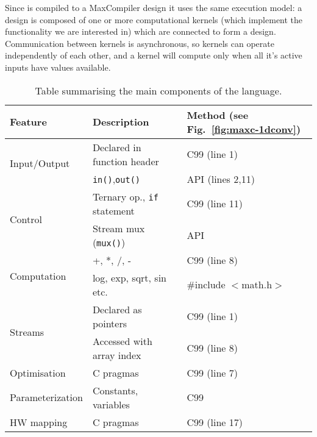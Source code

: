 Since \MAXC{} is compiled to a MaxCompiler design it uses the same
execution model: a design is composed of one or more computational
kernels (which implement the functionality we are interested in) which
are connected to form a design. Communication between kernels is
asynchronous, so kernels can operate independently of each other, and
a kernel will compute only when all it's active inputs have values
available.

\begin{table}[!h]
  \centering
\renewcommand{\arraystretch}{1.2}
\caption{Table summarising the main components of the \MAXC{} language.}
\label{table:maxc-features}
\begin{tabular}{l|l|l}
\hline
\bf{Feature}                   & \bf{Description}                   & \bf{Method (see Fig.~\ref{fig:maxc-1dconv})} \\
\hline\hline
  \multirow{2}{*}{Input/Output}         & Declared in function header          & C99 (line 1)                                 \\\cline{2-3}       & \texttt{in()},\texttt{out()}  & \MAXC{} API (lines 2,11) \\
\hline
  \multirow{2}{*}{Control}     & Ternary op., \texttt{if} statement & C99 (line 11)                                \\\cline{2-3}      & Stream mux (\texttt{mux()})       & \MAXC{} API  \\
\hline
\multirow{2}{*}{Computation} & +, *, /, -                         & C99 (line 8)                           \\\cline{2-3} & log, exp, sqrt, sin etc.  & \#include $<$math.h$>$  \\
\hline
  \multirow{2}{*}{Streams}     & Declared as pointers               & C99 (line 1)                                 \\\cline{2-3}       & Accessed with array index & C99 (line 8) \\
\hline
  Optimisation                 & C pragmas                   & C99 (line 7)                                 \\
\hline
  Parameterization             & Constants, variables                   & C99                                          \\
\hline
HW mapping                  & C pragmas                   & C99 (line 17)                                \\
\end{tabular}
\vspace{-0.4cm}
\end{table}

